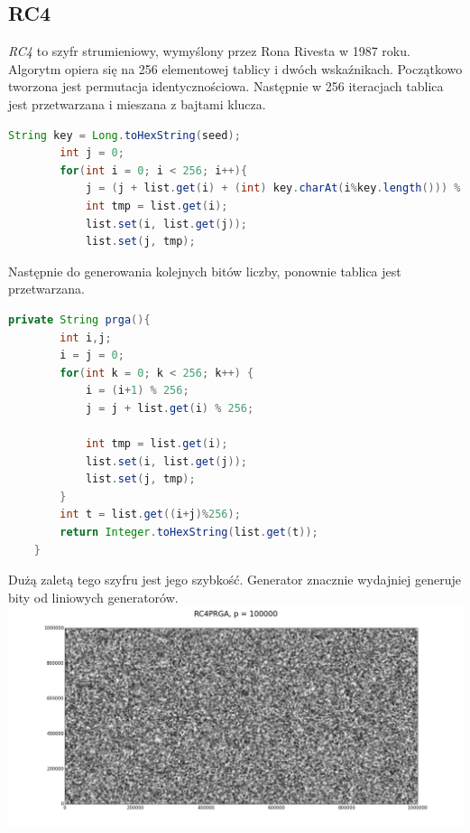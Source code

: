 \documentclass[a4paper, 11pt]{article} %
\begin{document}
\subsection{RC4}
\textit{RC4} to szyfr strumieniowy, wymyślony przez Rona Rivesta w 1987 roku. Algorytm opiera się na 256 elementowej tablicy i dwóch wskaźnikach. Początkowo tworzona jest permutacja identycznościowa. Następnie w 256 iteracjach tablica jest przetwarzana i mieszana z bajtami klucza.
\begin{lstlisting}[style=mystyle, language=java, frame=single, caption = Inicjalizowanie RC4.]
        String key = Long.toHexString(seed);
        int j = 0;
        for(int i = 0; i < 256; i++){
            j = (j + list.get(i) + (int) key.charAt(i%key.length())) % 256;
            int tmp = list.get(i);
            list.set(i, list.get(j));
            list.set(j, tmp);
\end{lstlisting}
Następnie do generowania kolejnych bitów liczby, ponownie tablica jest przetwarzana.
\begin{lstlisting}[style=mystyle, language=java, frame=single, caption = Generowanie losowego bajtu liczby za pomocą RC4.]
    private String prga(){
        int i,j;
        i = j = 0;
        for(int k = 0; k < 256; k++) {
        	i = (i+1) % 256;
        	j = j + list.get(i) % 256;

        	int tmp = list.get(i);
        	list.set(i, list.get(j));
        	list.set(j, tmp);
        }
        int t = list.get((i+j)%256);
        return Integer.toHexString(list.get(t));
    }
\end{lstlisting}
Dużą zaletą tego szyfru jest jego szybkość. Generator znacznie wydajniej generuje bity od liniowych generatorów.\\
\includegraphics[width=\linewidth]{img/rc4-1.png}
\end{document}
